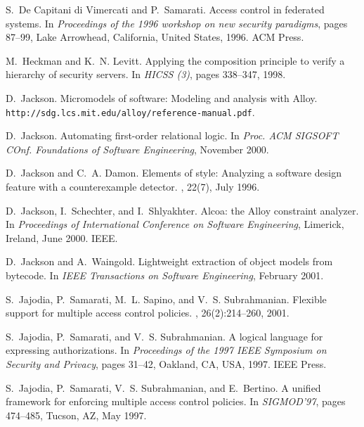 \documentclass{acm_proc_article-sp}
\begin{document}
\begin{thebibliography}{10}
S.~{De Capitani di Vimercati} and P.~Samarati.
\newblock Access control in federated systems.
\newblock In {\em Proceedings of the 1996 workshop on new security paradigms},
  pages 87--99, Lake Arrowhead, California, United States, 1996. ACM Press.

M.~Heckman and K.~N. Levitt.
\newblock Applying the composition principle to verify a hierarchy of security
  servers.
\newblock In {\em {HICSS} (3)}, pages 338--347, 1998.

D.~Jackson.
\newblock Micromodels of software: Modeling and analysis with {A}lloy.
\newblock \texttt{http://sdg.lcs.mit.edu/alloy/reference-manual.pdf}.

D.~Jackson.
\newblock Automating first-order relational logic.
\newblock In {\em Proc. ACM SIGSOFT COnf. Foundations of Software Engineering},
  November 2000.

D.~Jackson and C.~A. Damon.
\newblock Elements of style: Analyzing a software design feature with a
  counterexample detector.
, 22(7), July 1996.

D.~Jackson, I.~Schechter, and I.~Shlyakhter.
\newblock Alcoa: the {A}lloy constraint analyzer.
\newblock In {\em Proceedings of International Conference on Software
  Engineering}, Limerick, Ireland, June 2000. IEEE.

D.~Jackson and A.~Waingold.
\newblock Lightweight extraction of object models from bytecode.
\newblock In {\em IEEE Transactions on Software Engineering}, February 2001.

S.~Jajodia, P.~Samarati, M.~L. Sapino, and V.~S. Subrahmanian.
\newblock Flexible support for multiple access control policies.
, 26(2):214--260, 2001.

S.~Jajodia, P.~Samarati, and V.~S. Subrahmanian.
\newblock A logical language for expressing authorizations.
\newblock In {\em Proceedings of the 1997 IEEE Symposium on Security and
  Privacy}, pages 31--42, Oakland, CA, USA, 1997. IEEE Press.

S.~Jajodia, P.~Samarati, V.~S. Subrahmanian, and E.~Bertino.
\newblock A unified framework for enforcing multiple access control policies.
\newblock In {\em SIGMOD'97}, pages 474--485, Tucson, AZ, May 1997.


\end{thebibliography}
\end{document}
